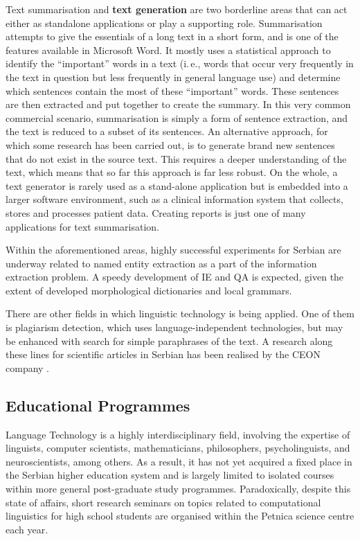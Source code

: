 \begin{multicols}{2}


Text summarisation and \textbf{text generation} are two borderline areas that can act either as standalone applications or play a supporting role. Summarisation attempts to give the essentials of a long text in a short form, and is one of the features available in Microsoft Word. It mostly uses a statistical approach to identify the “important” words in a text (i.\,e., words that occur very frequently in the text in question but less frequently in general language use) and determine which sentences contain the most of these “important” words. These sentences are then extracted and put together to create the summary. In this very common commercial scenario, summarisation is simply a form of sentence extraction, and the text is reduced to a subset of its sentences. An alternative approach, for which some research has been carried out, is to generate brand new sentences that do not exist in the source text. This requires a deeper understanding of the text, which means that so far this approach is far less robust. On the whole, a text generator is rarely used as a stand-alone application but is embedded into a larger software environment, such as a clinical information system that collects, stores and processes patient data. Creating reports is just one of many applications for text summarisation.


Within the aforementioned areas, highly successful experiments for Serbian are underway related to named entity extraction as a part of the information extraction problem. A speedy development of IE and QA is expected, given the extent of developed morphological dictionaries and local grammars.

There are other fields in which linguistic technology is being applied. One of them is plagiarism detection, which uses language-independent technologies, but may be enhanced with search for simple paraphrases of the text. A research along these lines for scientific articles in Serbian has been realised by the CEON company \cite{CEON}.
 \subsection {Educational Programmes}

Language Technology is a highly interdisciplinary field, involving the expertise of linguists, computer scientists, mathematicians, philosophers, psycholinguists, and neuroscientists, among others. As a result, it has not yet acquired a fixed place in the Serbian higher education system and is largely limited to isolated courses within more general post-graduate study programmes. Paradoxically, despite this state of affairs, short research seminars on topics related to computational linguistics for high school students are organised within the Petnica science centre \cite{PETNICA} each year. 


\end{multicols}

